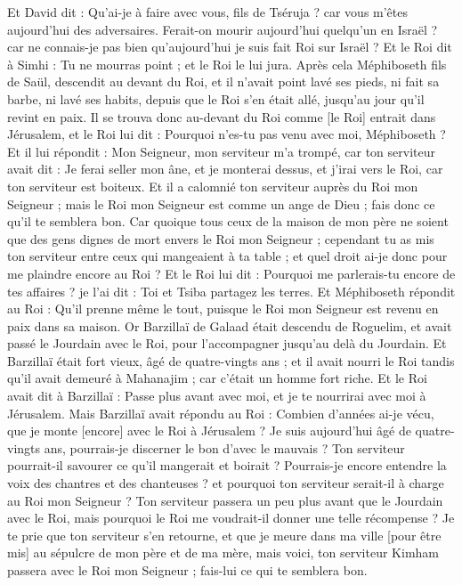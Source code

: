 \begin{multicols}{2}
Et David dit : Qu'ai-je à faire avec vous, fils de Tséruja ? car vous m'êtes aujourd'hui des adversaires. Ferait-on mourir aujourd'hui quelqu'un en Israël ? car ne connais-je pas bien qu'aujourd'hui je suis fait Roi sur Israël ?
Et le Roi dit à Simhi : Tu ne mourras point ; et le Roi le lui jura.
Après cela Méphiboseth fils de Saül, descendit au devant du Roi, et il n'avait point lavé ses pieds, ni fait sa barbe, ni lavé ses habits, depuis que le Roi s'en était allé, jusqu'au jour qu'il revint en paix.
Il se trouva donc au-devant du Roi comme [le Roi] entrait dans Jérusalem, et le Roi lui dit : Pourquoi n'es-tu pas venu avec moi, Méphiboseth ?
Et il lui répondit : Mon Seigneur, mon serviteur m'a trompé, car ton serviteur avait dit : Je ferai seller mon âne, et je monterai dessus, et j'irai vers le Roi, car ton serviteur est boiteux.
Et il a calomnié ton serviteur auprès du Roi mon Seigneur ; mais le Roi mon Seigneur est comme un ange de Dieu ; fais donc ce qu'il te semblera bon.
Car quoique tous ceux de la maison de mon père ne soient que des gens dignes de mort envers le Roi mon Seigneur ; cependant tu as mis ton serviteur entre ceux qui mangeaient à ta table ; et quel droit ai-je donc pour me plaindre encore au Roi ?
Et le Roi lui dit : Pourquoi me parlerais-tu encore de tes affaires ? je l'ai dit : Toi et Tsiba partagez les terres.
Et Méphiboseth répondit au Roi : Qu'il prenne même le tout, puisque le Roi mon Seigneur est revenu en paix dans sa maison.
Or Barzillaï de Galaad était descendu de Roguelim, et avait passé le Jourdain avec le Roi, pour l'accompagner jusqu'au delà du Jourdain.
Et Barzillaï était fort vieux, âgé de quatre-vingts ans ; et il avait nourri le Roi tandis qu'il avait demeuré à Mahanajim ; car c'était un homme fort riche.
Et le Roi avait dit à Barzillaï : Passe plus avant avec moi, et je te nourrirai avec moi à Jérusalem.
Mais Barzillaï avait répondu au Roi : Combien d'années ai-je vécu, que je monte [encore] avec le Roi à Jérusalem ?
Je suis aujourd'hui âgé de quatre-vingts ans, pourrais-je discerner le bon d'avec le mauvais ? Ton serviteur pourrait-il savourer ce qu'il mangerait et boirait ? Pourrais-je encore entendre la voix des chantres et des chanteuses ? et pourquoi ton serviteur serait-il à charge au Roi mon Seigneur ?
Ton serviteur passera un peu plus avant que le Jourdain avec le Roi, mais pourquoi le Roi me voudrait-il donner une telle récompense ?
Je te prie que ton serviteur s'en retourne, et que je meure dans ma ville [pour être mis] au sépulcre de mon père et de ma mère, mais voici, ton serviteur Kimham passera avec le Roi mon Seigneur ; fais-lui ce qui te semblera bon.

\end{multicols}
